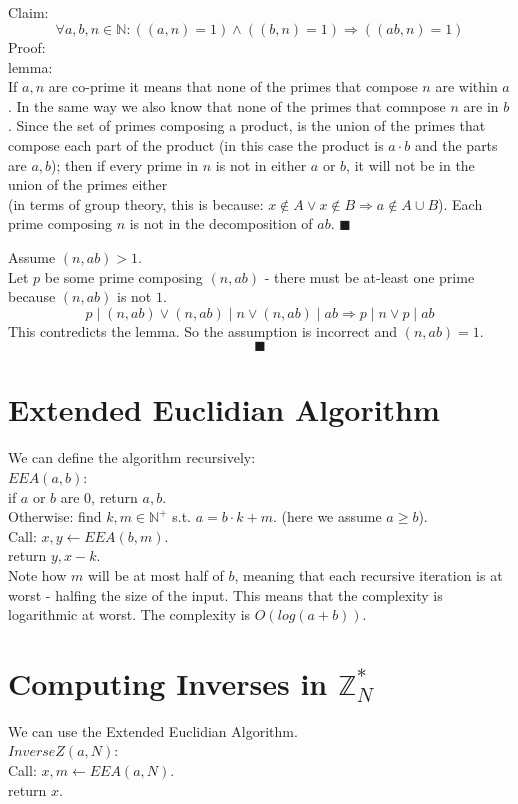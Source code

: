 \documentclass{article}
\begin{document}
\subsection{}
Claim:
\[
	\forall a,b,n\in\mathbb{N}: ((a,n)=1)\wedge((b,n)=1)\Rightarrow((ab,n)=1)
\]
Proof:\\
lemma:\\
If $a,n$ are co-prime it means that none of the primes that compose $n$ are within $a$.
In the same way we also know that none of the primes that comnpose $n$ are in $b$.
Since the set of primes composing a product, is the union of the primes that compose each part of the 
product (in this case the product is $a\cdot b$ and the parts are $a,b$); then if every prime in $n$
is not in either $a$ or $b$, it will not be in the union of the primes either\\
(in terms of group theory, this is because: $x\notin A\vee x\notin B\Rightarrow a\notin A\cup B$).
Each prime composing $n$ is not in the decomposition of $ab$. $\blacksquare$

Assume $(n,ab)>1$.\\
Let $p$ be some prime composing $(n,ab)$ - 
there must be at-least one prime because $(n,ab)$ is not $1$.
\[
	p\mid (n,ab)\vee (n,ab)\mid n\vee (n,ab)\mid ab
	\Rightarrow p\mid n \vee p\mid ab
\]
This contredicts the lemma.
So the assumption is incorrect and $(n,ab)=1$.
\[\blacksquare\]

\section{Extended Euclidian Algorithm}
We can define the algorithm recursively:\\
$EEA(a,b)$:\\
if $a$ or $b$ are $0$, return $a,b$.\\
Otherwise: find $k,m\in\mathbb{N}^+$ s.t. $a=b\cdot k+m$. (here we assume $a\geq b$).\\
Call: $x,y\longleftarrow EEA(b,m)$.\\
return $y,x-k$.\\
Note how $m$ will be at most half of $b$, meaning that each recursive iteration is at worst
- halfing the size of the input. This means that the complexity is logarithmic at worst.
The complexity is $O(log(a+b))$.

\section{Computing Inverses in $\mathbb{Z}^*_N$}
We can use the Extended Euclidian Algorithm.\\
$InverseZ(a,N)$:\\
Call: $x, m\longleftarrow EEA(a,N)$.\\
return $x$.
\end{document}
